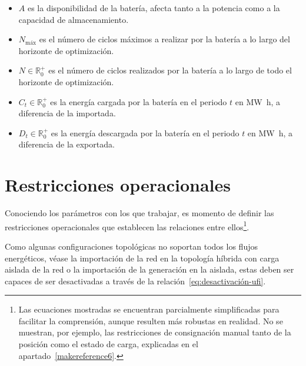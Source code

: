 \begin{itemize}
  \item \( A \) es la disponibilidad de la batería, afecta tanto a la potencia como a la capacidad de almacenamiento.

  \item \( N_{\text{máx}} \) es el número de ciclos máximos a realizar por la batería a lo largo del horizonte de optimización.

  \item \( N \in \mathbb{R}^{+}_{0} \) es el número de ciclos realizados por la batería a lo largo de todo el horizonte de optimización.

  \item \( C_{t} \in \mathbb{R}^{+}_{0} \) es la energía cargada por la batería en el periodo \( t \) en \si{{\mega\watt\hour}}, a diferencia de la importada.

  \item \( D_{t} \in \mathbb{R}^{+}_{0} \) es la energía descargada por la batería en el periodo \( t \) en \si{{\mega\watt\hour}}, a diferencia de la exportada.

\end{itemize}

\section{Restricciones operacionales}%
\label{makereference5.2}

Conociendo los parámetros con los que trabajar, es momento de definir las restricciones operacionales que establecen las relaciones entre ellos\footnote{Las ecuaciones mostradas se encuentran parcialmente simplificadas para facilitar la comprensión, aunque resulten más robustas en realidad. No se muestran, por ejemplo, las restricciones de consignación manual tanto de la posición como el estado de carga, explicadas en el apartado~\ref{makereference6}.}.

Como algunas configuraciones topológicas no soportan todos los flujos energéticos, véase la importación de la red en la topología híbrida con carga aislada de la red o la importación de la generación en la aislada, estas deben ser capaces de ser desactivadas a través de la relación~\ref{eq:desactivación-ufi}.

